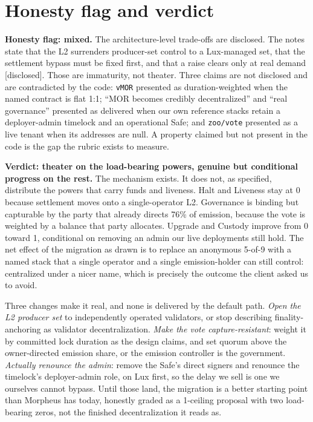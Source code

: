 \documentclass[11pt,a4paper]{article}
\newcommand{\code}[1]{\texttt{\small #1}}
\newcommand{\pv}[1]{{\color{muted}\sffamily\scriptsize[#1]}}
\begin{document}
\section{Honesty flag and verdict}

\noindent\textbf{Honesty flag: mixed.} The architecture-level trade-offs are
disclosed. The notes state that the L2 surrenders producer-set control to a
Lux-managed set, that the settlement bypass must be fixed first, and that a raise
clears only at real demand \pv{disclosed}. Those are immaturity, not theater.
Three claims are not disclosed and are contradicted by the code: \code{vMOR}
presented as duration-weighted when the named contract is flat 1:1; ``MOR becomes
credibly decentralized'' and ``real governance'' presented as delivered when our
own reference stacks retain a deployer-admin timelock and an operational Safe; and
\code{zoo/vote} presented as a live tenant when its addresses are null. A property
claimed but not present in the code is the gap the rubric exists to measure.

\noindent\textbf{Verdict: theater on the load-bearing powers, genuine but
conditional progress on the rest.} The mechanism exists. It does not, as
specified, distribute the powers that carry funds and liveness. Halt and Liveness
stay at 0 because settlement moves onto a single-operator L2. Governance is
binding but capturable by the party that already directs 76\% of emission, because
the vote is weighted by a balance that party allocates. Upgrade and Custody
improve from 0 toward 1, conditional on removing an admin our live deployments
still hold. The net effect of the migration as drawn is to replace an anonymous
5-of-9 with a named stack that a single operator and a single emission-holder can
still control: centralized under a nicer name, which is precisely the outcome the
client asked us to avoid.

Three changes make it real, and none is delivered by the default path.
\emph{Open the L2 producer set} to independently operated validators, or stop
describing finality-anchoring as validator decentralization. \emph{Make the vote
capture-resistant}: weight it by committed lock duration as the design claims, and
set quorum above the owner-directed emission share, or the emission controller is
the government. \emph{Actually renounce the admin}: remove the Safe's direct
signers and renounce the timelock's deployer-admin role, on Lux first, so the
delay we sell is one we ourselves cannot bypass. Until those land, the migration is
a better starting point than Morpheus has today, honestly graded as a 1-ceiling
proposal with two load-bearing zeros, not the finished decentralization it reads as.

\vspace{0.8ex}
\end{document}
